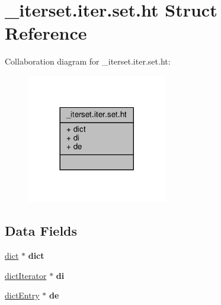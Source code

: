 \hypertarget{structzsetopsrc_1_1__iterset_8iter_8set_8ht}{}\section{\+\_\+iterset.\+iter.\+set.\+ht Struct Reference}
\label{structzsetopsrc_1_1__iterset_8iter_8set_8ht}


Collaboration diagram for \+\_\+iterset.\+iter.\+set.\+ht\+:\nopagebreak
\begin{figure}[H]
\begin{center}
\leavevmode
\includegraphics[width=173pt]{structzsetopsrc_1_1__iterset_8iter_8set_8ht__coll__graph}
\end{center}
\end{figure}
\subsection*{Data Fields}
\begin{DoxyCompactItemize}
\item 
\mbox{\label{structzsetopsrc_1_1__iterset_8iter_8set_8ht_abb4c374392133719a324ab1ba2799cd6}} 
\hyperlink{structdict}{dict} $\ast$ {\bfseries dict}
\item 
\mbox{\label{structzsetopsrc_1_1__iterset_8iter_8set_8ht_a690382ddccb8abc7367a136262e1978f}} 
\hyperlink{structdictIterator}{dict\+Iterator} $\ast$ {\bfseries di}
\item 
\mbox{\label{structzsetopsrc_1_1__iterset_8iter_8set_8ht_a5f02f0889301fd7be1ac972c11bf3e7d}} 
\hyperlink{structdictEntry}{dict\+Entry} $\ast$ {\bfseries de}
\end{DoxyCompactItemize}



